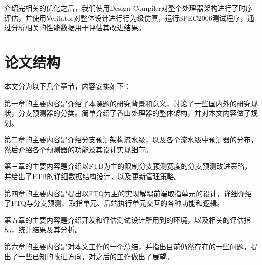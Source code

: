 介绍完相关的优化之后，我们使用Design Compiler对整个处理器架构进行了时序评估，并使用Verilator对整体设计进行行为级仿真，运行SPEC2006测试程序，通过分析相关的性能数据用于评估其改进结果。

\section{论文结构}

本文分为以下几个章节，内容安排如下：

第一章的主要内容是介绍了本课题的研究背景和意义，讨论了一些国内外的研究现状，分支预测器的分类。简单介绍了香山处理器的整体架构，并对本文内容做了规划。

第二章的主要内容是介绍分支预测架构流水级，以及各个流水级中预测器的分布，然后介绍各个预测器的功能及其设计实现细节。

第三章的主要内容是介绍以FTB为主的限制分支预测宽度的分支预测改进策略，并给出了FTB的详细数据结构设计，以及更新管理策略。

第四章的主要内容是提出以FTQ为主的实现解耦前端取指单元的设计，详细介绍了FTQ与分支预测、取指单元、后端执行单元交互的各种功能和逻辑。


第五章的主要内容是介绍开发和评估测试设计所用到的环境，以及相关的评估指标，统计结果及其分析。

第六章的主要内容是对本文工作的一个总结，并指出目前仍然存在的一些问题，提出了一些已知的改进方向，对之后的工作做出了展望。

